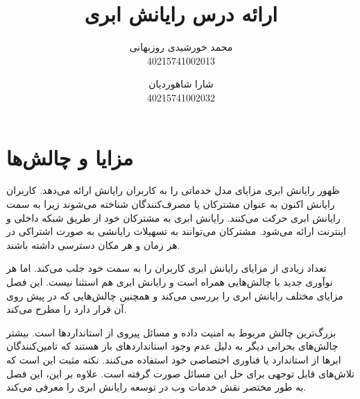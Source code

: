 \documentclass{book}
\title{ارائه درس رایانش ابری}
\author{محمد خورشیدی روزبهانی\\40215741002013 \and شارا شاهوردیان\\40215741002032}
\date{}
\begin{document}
    \maketitle

    \tableofcontents

    \newpage

    \chapter{مزایا و چالش‌ها}

        ظهور رایانش ابری مزایای مدل خدماتی را به کاربران رایانش ارائه می‌دهد. کاربران رایانش اکنون به عنوان مشترکان یا مصرف‌کنندگان شناخته می‌شوند زیرا به سمت رایانش ابری حرکت می‌کنند. رایانش ابری به مشترکان خود از طریق شبکه داخلی و اینترنت ارائه می‌شود. مشترکان می‌توانند به تسهیلات رایانشی به صورت اشتراکی در هر زمان و هر مکان دسترسی داشته باشند.

        تعداد زیادی از مزایای رایانش ابری کاربران را به سمت خود جلب می‌کند. اما هر نوآوری جدید با چالش‌هایی همراه است و رایانش ابری هم استثنا نیست. این فصل مزایای مختلف رایانش ابری را بررسی می‌کند و همچنین چالش‌هایی که در پیش روی آن قرار دارد را مطرح می‌کند.
    
        بزرگ‌ترین چالش مربوط به امنیت داده و مسائل پیروی از استانداردها است. بیشتر چالش‌های بحرانی دیگر به دلیل عدم وجود استانداردهای باز هستند که تامین‌کنندگان ابرها از استاندارد یا فناوری اختصاصی خود استفاده می‌کنند. نکته مثبت این است که تلاش‌های قابل توجهی برای حل این مسائل صورت گرفته است. علاوه بر این، این فصل به طور مختصر نقش خدمات وب در توسعه رایانش ابری را 
        معرفی می‌کند.
\end{document}
